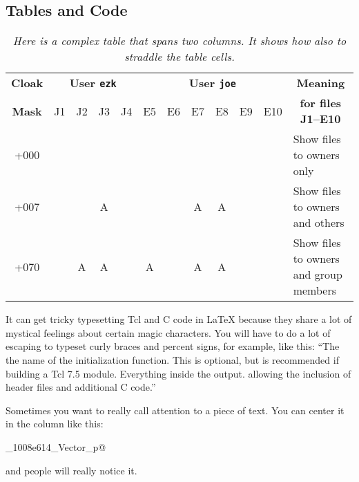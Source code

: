 \documentclass[XXX,endnotes]{usetex-v1}
\begin{document}
\subsection{Tables and Code}

\begin{table*}[htbp]
\centering
\begin{tabular}{|c||c|c|c|c||c|c|c|c|c|c|l|}\hline
         {\bf Cloak}
        & \multicolumn{4}{c||}{\textbf{User \texttt{ezk}}}
        & \multicolumn{6}{c|}{\textbf{User \texttt{joe}}}
        & \multicolumn{1}{c|}{\textbf{Meaning}}
\\\cline{2-11}
        {\bf Mask}
        &{J1}
        &{J2}
        &{J3}
        &{J4}
        &{E5}
        &{E6}
        &{E7}
        &{E8}
        &{E9}
        &{E10}
        &\multicolumn{1}{c|}{\textbf{for files J1--E10}}
\\\hline
         {+000}
        &
        &
        &
        &
        &
        &
        &
        &
        &
        &
        & Show files to owners only
\\\hline
         {+007}
        &
        &
        &{A}
        &
        &
        &
        &{A}
        &{A}
        &
        &
        & Show files to owners and others
\\\hline
         {+070}
        &
        &{A}
        &{A}
        &
        &{A}
        &
        &{A}
        &{A}
        &
        &
        & Show files to owners and group members
\\\hline
\end{tabular}
\small\itshape
\caption{\small\itshape Here is a complex table that spans two columns.  It
  shows how also to straddle the table cells.}
\label{tab-sample}
\end{table*}

It can get tricky typesetting Tcl and C code in LaTeX because they
share a lot of mystical feelings about certain magic characters.  You
will have to do a lot of escaping to typeset curly braces and percent
signs, for example, like this: ``The \verb@%module@ directive sets
the name of the initialization function.  This is optional, but is
recommended if building a Tcl 7.5 module.  Everything inside the 
\verb@%{@, \verb@%}@ block is copied directly into the
output. allowing the inclusion of header files and additional C code.''

Sometimes you want to really call attention to a piece of text.  You
can center it in the column like this:
\begin{center}
\verb@_1008e614_Vector_p@
\end{center}
and people will really notice it.
\end{document}
